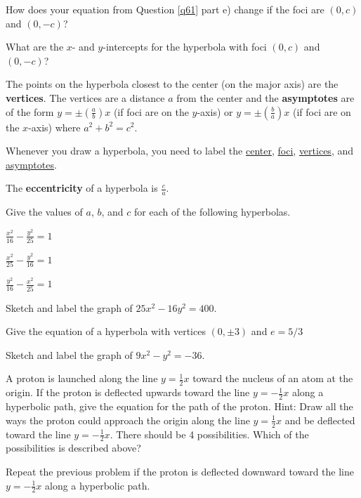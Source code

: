 \bq \be
\item How does your equation from Question \ref{q61} part e) change if the foci are $(0,c)$ and $(0,-c)$?
\item What are the $x$- and $y$-intercepts for the hyperbola with foci $(0,c)$ and $(0,-c)$?
\ee \eq

\begin{info}
The points on the hyperbola closest to the center (on the major axis) are the \textbf{vertices}. The vertices are a distance $a$ from the center and the \textbf{asymptotes} are of the form $y=\pm(\frac{a}{b}) x$ (if foci are on the $y$-axis) or $y=\pm(\frac{b}{a}) x$ (if foci are on the $x$-axis) where $a^2+b^2=c^2$.

Whenever you draw a hyperbola, you need to label the \underline{center}, \underline{foci}, \underline{vertices}, and \underline{asymptotes}.

The \textbf{eccentricity} of a hyperbola is $\frac{c}{a}$. \end{info}

\bq Give the values of $a$, $b$, and $c$ for each of the following hyperbolas.
\be
\item $\frac{x^2}{16}-\frac{y^2}{25}=1$
\item $\frac{x^2}{25}-\frac{y^2}{16}=1$
\item $\frac{y^2}{16}-\frac{x^2}{25}=1$
\ee
\eq

\bq Sketch and label the graph of $25x^2-16y^2=400$. \eq

\bq Give the equation of a hyperbola with vertices $(0,\pm3)$ and $e=5/3$ \eq

\bq Sketch and label the graph of $9x^2-y^2=-36$. \eq

\bq  A proton is launched along the line $y = \frac{1}{2} x$ toward the nucleus of an atom at the origin. If the proton is deflected upwards toward the line $y = -\frac{1}{2} x$ along a hyperbolic path, give the equation for the path of the proton. Hint: Draw all the ways the proton could approach the origin along the line $y=\frac{1}{2} x$ and be deflected toward the line $y =-\frac{1}{2} x$. There should be 4 possibilities. Which of the possibilities is described above? \eq

\bq Repeat the previous problem if the proton is deflected downward toward the line $y = -\frac{1}{2} x$ along a hyperbolic path. \eq

